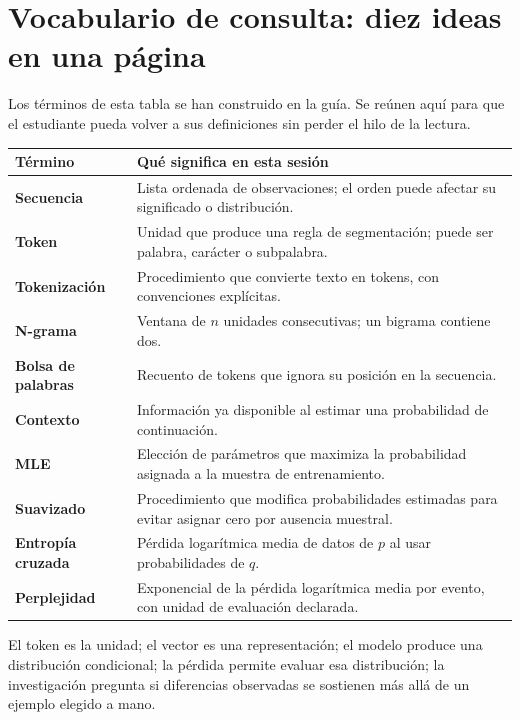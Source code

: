\chapter*{Vocabulario de consulta: diez ideas en una página}
Los términos de esta tabla se han construido en la guía. Se reúnen aquí para que el estudiante pueda volver a sus definiciones sin perder el hilo de la lectura.
\begin{center}
\begin{tabularx}{\textwidth}{>{\bfseries}p{37mm}X}\toprule
Término & Qué significa en esta sesión \\\midrule
Secuencia & Lista ordenada de observaciones; el orden puede afectar su significado o distribución.\\
Token & Unidad que produce una regla de segmentación; puede ser palabra, carácter o subpalabra.\\
Tokenización & Procedimiento que convierte texto en tokens, con convenciones explícitas.\\
N-grama & Ventana de $n$ unidades consecutivas; un bigrama contiene dos.\\
Bolsa de palabras & Recuento de tokens que ignora su posición en la secuencia.\\
Contexto & Información ya disponible al estimar una probabilidad de continuación.\\
MLE & Elección de parámetros que maximiza la probabilidad asignada a la muestra de entrenamiento.\\
Suavizado & Procedimiento que modifica probabilidades estimadas para evitar asignar cero por ausencia muestral.\\
Entropía cruzada & Pérdida logarítmica media de datos de $p$ al usar probabilidades de $q$.\\
Perplejidad & Exponencial de la pérdida logarítmica media por evento, con unidad de evaluación declarada.\\\bottomrule
\end{tabularx}
\end{center}
\begin{idea}
El token es la unidad; el vector es una representación; el modelo produce una distribución condicional; la pérdida permite evaluar esa distribución; la investigación pregunta si diferencias observadas se sostienen más allá de un ejemplo elegido a mano.
\end{idea}
\clearpage
